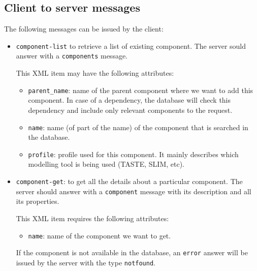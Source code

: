 \documentclass[11pt]{book}
\begin{document}
      \subsection{Client to server messages}
      The following messages can
      be issued by the client:
      \begin{itemize}
         \item
            \texttt{component-list} to retrieve a list of existing component.
            The server sould answer with a \texttt{components} message.


            This XML item may have the following attributes:
            \begin{itemize}
               \item
                  \texttt{parent\_name}: name of the parent component where we
                  want to add this component. In case of a dependency, the
                  database will check this dependency and include only relevant
                  components to the request.
               \item
                  \texttt{name}: name (of part of the name) of the component
                  that is searched in the database.
               \item
                  \texttt{profile}: profile used for this component. It mainly
                  describes which modelling tool is being used (TASTE, SLIM,
                  etc).
            \end{itemize}
         \item
            \texttt{component-get}: to get all the details about a particular
            component. The server should answer with a \texttt{component}
            message with its description and all its properties.


            This XML item requires the following attributes:
            \begin{itemize}
               \item
                  \texttt{name}: name of the component we want to get.
            \end{itemize}

            If the component is not available in the database, an \texttt{error}
            answer will be issued by the server with the type \texttt{notfound}.
      \end{itemize}
\end{document}

